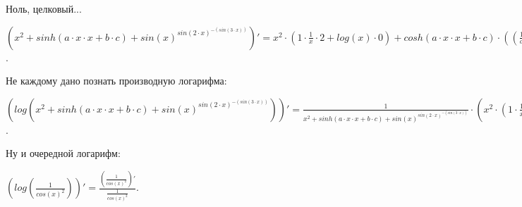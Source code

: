 \documentclass{article}
\begin{document}
Ноль, целковый...\\
\begin{center}$({x^{{2}}}+sinh(a \cdot x \cdot x+b \cdot c)+{sin(x)^{sin({2} \cdot x)^{-(sin({3} \cdot x))}}})'= {x^{{2}}} \cdot ({1} \cdot  \frac {1} {{x}} \cdot {{2}}+log(x) \cdot {0})+cosh(a \cdot x \cdot x+b \cdot c) \cdot (( \frac {1} {{a}} \cdot {0}+ \frac {1} {{x}} \cdot {1}+ \frac {1} {{x}} \cdot {1}) \cdot a \cdot x \cdot x+( \frac {1} {{b}} \cdot {0}+ \frac {1} {{c}} \cdot {0}) \cdot b \cdot c)+{sin(x)^{sin({2} \cdot x)^{-(sin({3} \cdot x))}}} \cdot (cos(x) \cdot {1} \cdot  \frac {1} {{sin(x)}} \cdot  \frac {1} {{sin({2} \cdot x)} ^ {sin({3} \cdot x)}}+log(sin(x)) \cdot  \frac {1} {{sin({2} \cdot x)} ^ {sin({3} \cdot x)}} \cdot (cos({2} \cdot x) \cdot ( \frac {1} {{{2}}} \cdot {0}+ \frac {1} {{x}} \cdot {1}) \cdot {2} \cdot x \cdot  \frac {1} {{sin({2} \cdot x)}} \cdot {-(sin({3} \cdot x))}+log(sin({2} \cdot x)) \cdot -(cos({3} \cdot x) \cdot ( \frac {1} {{{3}}} \cdot {0}+ \frac {1} {{x}} \cdot {1}) \cdot {3} \cdot x)))$.\end{center}
Не каждому дано познать производную логарифма:\\
\begin{center}$(log({x^{{2}}}+sinh(a \cdot x \cdot x+b \cdot c)+{sin(x)^{sin({2} \cdot x)^{-(sin({3} \cdot x))}}}))'=  \frac {1} {{{x^{{2}}}+sinh(a \cdot x \cdot x+b \cdot c)+{sin(x)^{sin({2} \cdot x)^{-(sin({3} \cdot x))}}}}} \cdot ({x^{{2}}} \cdot ({1} \cdot  \frac {1} {{x}} \cdot {{2}}+log(x) \cdot {0})+cosh(a \cdot x \cdot x+b \cdot c) \cdot (( \frac {1} {{a}} \cdot {0}+ \frac {1} {{x}} \cdot {1}+ \frac {1} {{x}} \cdot {1}) \cdot a \cdot x \cdot x+( \frac {1} {{b}} \cdot {0}+ \frac {1} {{c}} \cdot {0}) \cdot b \cdot c)+{sin(x)^{sin({2} \cdot x)^{-(sin({3} \cdot x))}}} \cdot (cos(x) \cdot {1} \cdot  \frac {1} {{sin(x)}} \cdot  \frac {1} {{sin({2} \cdot x)} ^ {sin({3} \cdot x)}}+log(sin(x)) \cdot  \frac {1} {{sin({2} \cdot x)} ^ {sin({3} \cdot x)}} \cdot (cos({2} \cdot x) \cdot ( \frac {1} {{{2}}} \cdot {0}+ \frac {1} {{x}} \cdot {1}) \cdot {2} \cdot x \cdot  \frac {1} {{sin({2} \cdot x)}} \cdot {-(sin({3} \cdot x))}+log(sin({2} \cdot x)) \cdot -(cos({3} \cdot x) \cdot ( \frac {1} {{{3}}} \cdot {0}+ \frac {1} {{x}} \cdot {1}) \cdot {3} \cdot x))))$.\end{center}
Ну и очередной логарифм:\\
\begin{center}$(log( \frac {1} {{{cos(x)^{{2}}}}}))'= \frac { ( \frac {1} {{{cos(x)^{{2}}}}})'} { \frac {1} {{{cos(x)^{{2}}}}}}$.\end{center}
\end{document}
